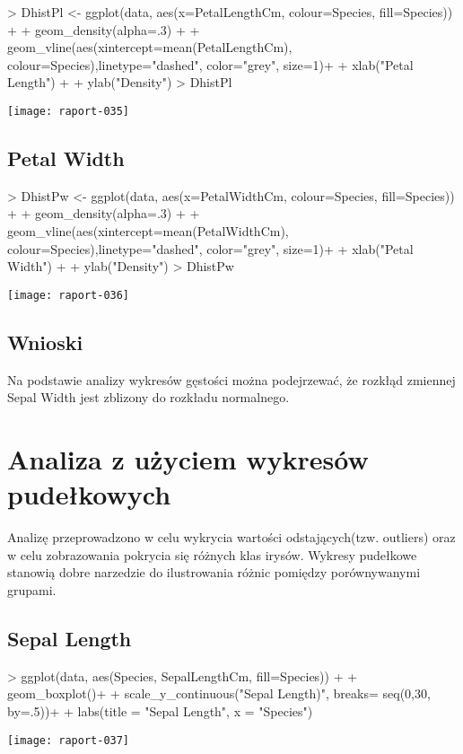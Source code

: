 \documentclass{article}
\begin{document}
\begin{Schunk}
\begin{Sinput}
> DhistPl <- ggplot(data, aes(x=PetalLengthCm, colour=Species, fill=Species)) +
+   geom_density(alpha=.3) +
+   geom_vline(aes(xintercept=mean(PetalLengthCm),  colour=Species),linetype="dashed", color="grey", size=1)+
+   xlab("Petal Length") +  
+   ylab("Density") 
> DhistPl
\end{Sinput}
\end{Schunk}
\texttt{[image: raport-035]}
\newpage
\subsection{Petal Width}

\begin{Schunk}
\begin{Sinput}
> DhistPw <- ggplot(data, aes(x=PetalWidthCm, colour=Species, fill=Species)) +
+   geom_density(alpha=.3) +
+   geom_vline(aes(xintercept=mean(PetalWidthCm),  colour=Species),linetype="dashed", color="grey", size=1)+
+   xlab("Petal Width") +  
+   ylab("Density") 
> DhistPw
\end{Sinput}
\end{Schunk}
\texttt{[image: raport-036]}

\subsection{Wnioski}
Na podstawie analizy wykresów gęstości można podejrzewać, że rozkłąd zmiennej Sepal Width jest zblizony do rozkładu normalnego.

\newpage
\section{Analiza z użyciem wykresów pudełkowych}

Analizę przeprowadzono w celu wykrycia wartości odstających(tzw. outliers) oraz w celu zobrazowania pokrycia się różnych klas irysów. Wykresy pudełkowe stanowią dobre narzedzie do ilustrowania różnic pomiędzy porównywanymi grupami.

\subsection{Sepal Length}
\begin{Schunk}
\begin{Sinput}
> ggplot(data, aes(Species, SepalLengthCm, fill=Species)) + 
+   geom_boxplot()+
+   scale_y_continuous("Sepal Length)", breaks= seq(0,30, by=.5))+
+   labs(title = "Sepal Length", x = "Species")
\end{Sinput}
\end{Schunk}
\texttt{[image: raport-037]}
\newpage
\end{document}
